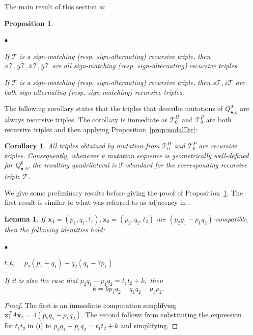 \documentclass[11pt, reqno]{amsart}
\newtheorem{lemma}[thm]{Lemma}
\newtheorem{prop}[thm]{Proposition}
\newtheorem{cor}[thm]{Corollary}
\theoremstyle{remark}
\numberwithin{equation}{subsection}
\numberwithin{figure}{section}
\theoremstyle{customremark}
\newcommand{\Tt}{\mathcal{T}}
\newenvironment{itemlist}
   { \begin{list} {$\bullet$}
         { \setlength{\topsep}{.5ex}  \setlength{\itemsep}{.5ex} \setlength{\leftmargin}{2.5ex} } }
   { \end{list} }
\newcommand{\ov}{\overline}
\begin{document}
The main result of this section is: 
    \begin{prop} \label{prop:genTrip} \begin{itemlist}
        \item[{(i)}]  If $\Tt$ is a sign-matching (resp. sign-alternating) recursive triple, then $x\Tt,y\Tt,\ov{x}\Tt,\ov{y}\Tt$ are all sign-matching  (resp. sign-alternating) recursive triples. 
        \item[{(ii)}] If $\Tt$ is a sign-matching (resp. sign-alternating) recursive triple, then $s\Tt,\ov{s}\Tt$ are both sign-alternating (resp. sign-matching) recursive triples. 
    \end{itemlist}
    \end{prop}

The following corollary states that the triples that describe mutations of $Q^0_{\bullet,b}$ are always recursive triples. The corollary is immediate as $\Tt_0^H$ and $\Tt_0^P$ are both recursive triples and then applying Proposition~\ref{prop:nodalDir}: 
    \begin{cor}
        All triples obtained by mutation from $\Tt_0^H$ and $\Tt_0^P$ are recursive triples. Consequently, whenever a mutation sequence is geometrically well-defined for $Q_{\bullet,b}^0$, the resulting quadrilateral is $\Tt$-standard for the corresponding recursive triple $\Tt$. 
    \end{cor}

    We give some preliminary results before giving the proof of Proposition~\ref{prop:genTrip}. The first result is similar to what was referred to as adjacency in \cite{MMW}. 

\begin{lemma} \label{lem:7cond}
    If $\bm{x}_1=(p_1,q_1,t_1),\bm{x}_2=(p_2,q_2,t_2)$ are $(p_2q_1-p_1q_2)$-compatible, then the following identities hold:
    \begin{itemlist}
        \item[{(i)}] $t_1t_2=p_2(p_1+q_1)+q_2(q_1-7p_1)$
        \item[{(ii)}] If it is also the case that $p_2q_1-p_1q_2=t_1t_2+k,$ then 
        \begin{equation}
            k=6p_1q_2-q_1q_2-p_1p_2. 
        \end{equation} 
    \end{itemlist}
\end{lemma}
\begin{proof}
    The first is an immediate computation simplifying $\bm{x}_1^TA\bm{x}_2=4(p_2q_1-p_1q_2).$ The second follows from substituting the expression for $t_1t_2$ in (i) to $p_2q_1-p_1q_2=t_1t_2+k$ and simplifying.  
\end{proof}
\end{document}
